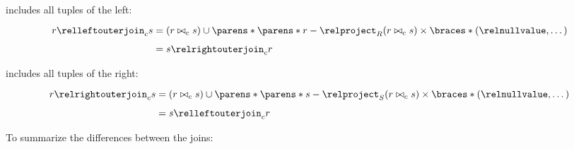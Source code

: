 \begin{multicols}{2}
\begin{CheatsheetEntryFrame}
        \textit{} includes all tuples of the left:
        \begin{align*}
            r \relleftouterjoin_c s &=
                (r \bowtie_c s)
                \cup \parens*{\vphantom{\frac{x}{x}}
                    \parens*{r - \relproject_R{(r \bowtie_c s)}}
                    \times \braces*{(\relnullvalue, \dots)}
                } \\
            &=
                s \relrightouterjoin_c r
        \end{align*}

        \textit{} includes all tuples of the right:
        \begin{align*}
            r \relrightouterjoin_c s &=
                (r \bowtie_c s)
                \cup \parens*{\vphantom{\frac{x}{x}}
                    \parens*{s - \relproject_S{(r \bowtie_c s)}}
                    \times \braces*{(\relnullvalue, \dots)}
                } \\
            &=
                s \relleftouterjoin_c r
        \end{align*}

        To summarize the differences between the joins:

        \vspace{1.0ex}


\end{CheatsheetEntryFrame}
\end{multicols}
